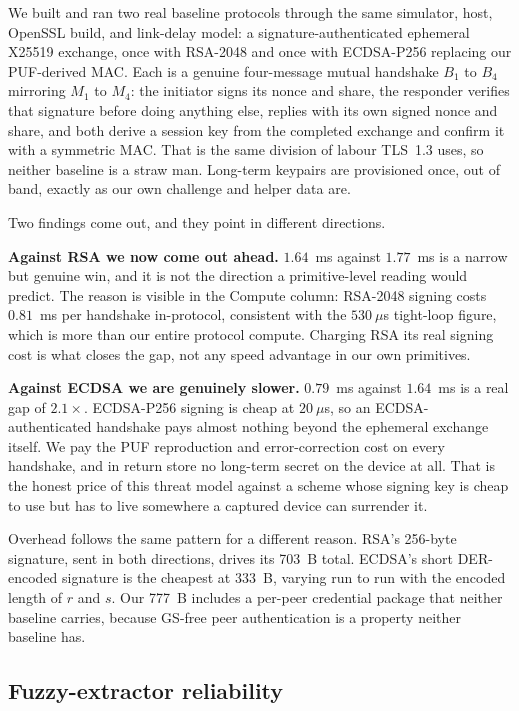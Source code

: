 \documentclass[conference]{IEEEtran}
\begin{document}
We built and ran two real baseline protocols through the same simulator, host,
OpenSSL build, and link-delay model: a signature-authenticated ephemeral X25519
exchange, once with RSA-2048 and once with ECDSA-P256 replacing our PUF-derived
MAC. Each is a genuine four-message mutual handshake $B_1$ to $B_4$ mirroring
$M_1$ to $M_4$: the initiator signs its nonce and share, the responder verifies
that signature before doing anything else, replies with its own signed nonce and
share, and both derive a session key from the completed exchange and confirm it
with a symmetric MAC. That is the same division of labour TLS~1.3 uses, so
neither baseline is a straw man. Long-term keypairs are provisioned once, out of
band, exactly as our own challenge and helper data are.

Two findings come out, and they point in different directions.

\textbf{Against RSA we now come out ahead.} $1.64$~ms against $1.77$~ms is a
narrow but genuine win, and it is not the direction a primitive-level reading
would predict. The reason is visible in the Compute column: RSA-2048 signing
costs $0.81$~ms per handshake in-protocol, consistent with the $530~\mu$s
tight-loop figure, which is more than our entire protocol compute. Charging RSA
its real signing cost is what closes the gap, not any speed advantage in our own
primitives.

\textbf{Against ECDSA we are genuinely slower.} $0.79$~ms against $1.64$~ms is a
real gap of $2.1\times$. ECDSA-P256 signing is cheap at $20~\mu$s, so an
ECDSA-authenticated handshake pays almost nothing beyond the ephemeral exchange
itself. We pay the PUF reproduction and error-correction cost on every handshake,
and in return store no long-term secret on the device at all. That is the honest
price of this threat model against a scheme whose signing key is cheap to use but
has to live somewhere a captured device can surrender it.

Overhead follows the same pattern for a different reason. RSA's 256-byte
signature, sent in both directions, drives its 703~B total. ECDSA's short
DER-encoded signature is the cheapest at 333~B, varying run to run with the
encoded length of $r$ and $s$. Our 777~B includes a per-peer credential
package that neither baseline carries, because GS-free peer authentication is a
property neither baseline has.

\subsection{Fuzzy-extractor reliability}
\end{document}
